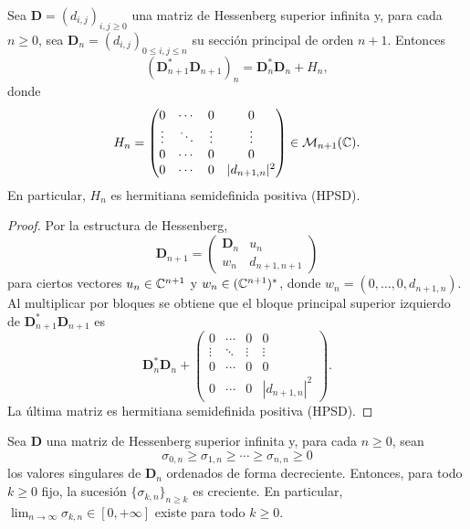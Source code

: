 \begin{lem}\label{lem:bloque_gram_truncadas}
	Sea \(\mathbf D=(d_{i,j})_{i,j\ge0}\) una matriz de Hessenberg superior infinita y, para cada \(n\ge0\), sea
	\(
	\mathbf D_n=(d_{i,j})_{0\le i,j\le n}
	\)
	su sección principal de orden \(n+1\). Entonces
	\[
		(\mathbf D_{n+1}^*\mathbf D_{n+1})_n
		=
		\mathbf D_n^*\mathbf D_n+H_n,
	\]
	donde
	\[
		H_n=
		\begin{pmatrix}
			0      & \cdots & 0      & 0             \\
			\vdots & \ddots & \vdots & \vdots        \\
			0      & \cdots & 0      & 0             \\
			0      & \cdots & 0      & |d_{n+1,n}|^2
		\end{pmatrix}
		\in\mathcal M_{n+1}(\mathbb{C}).
	\]
	En particular, \(H_n\) es hermitiana semidefinida positiva (HPSD).
\end{lem}

\begin{proof}
	Por la estructura de Hessenberg,
	\[
		\mathbf D_{n+1}=
		\begin{pmatrix}
			\mathbf D_n & u_n         \\
			w_n         & d_{n+1,n+1}
		\end{pmatrix}
	\]
	para ciertos vectores \(u_n\in\mathbb{C}^{n+1}\) y \(w_n\in(\mathbb{C}^{n+1})^*\), donde \(w_n=(0,\dots,0,d_{n+1,n})\).
	Al multiplicar por bloques se obtiene que el bloque principal superior izquierdo de \(\mathbf D_{n+1}^*\mathbf D_{n+1}\) es
	\[
		\mathbf D_n^*\mathbf D_n+
		\begin{pmatrix}
			0      & \cdots & 0      & 0             \\
			\vdots & \ddots & \vdots & \vdots        \\
			0      & \cdots & 0      & 0             \\
			0      & \cdots & 0      & |d_{n+1,n}|^2
		\end{pmatrix}.
	\]
	La última matriz es hermitiana semidefinida positiva (HPSD).
\end{proof}

\begin{prop}\label{prop:monotonia_sigma_kn}
	Sea \(\mathbf D\) una matriz de Hessenberg superior infinita y, para cada \(n\ge0\), sean
	\[
		\sigma_{0,n}\ge\sigma_{1,n}\ge\cdots\ge\sigma_{n,n}\ge0
	\]
	los valores singulares de \(\mathbf D_n\) ordenados de forma decreciente. Entonces, para todo \(k\ge0\) fijo, la sucesión \(\{\sigma_{k,n}\}_{n\ge k}\) es creciente. En particular, \(\lim_{n\to\infty}\sigma_{k,n}\in[0,+\infty]\) existe para todo \(k\ge0\).
\end{prop}

